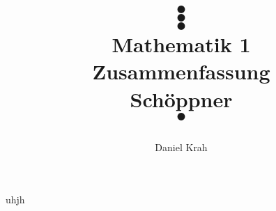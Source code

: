 \documentclass{article}
\title{
\color{white}
 $\bullet$ \\ $\bullet$ \\ $\bullet$ \\
 \color{black}
 \color{black}
 Mathematik 1\\
Zusammenfassung \\
Schöppner \\
\color{white}
$\bullet$ \\
\color{black}
 \begin{center}
\end{center}
}
\author{Daniel Krah}
\begin{document}
\maketitle%



%
% 







% 
\newpage




% 
% 
uhjh


% 
% 
% 
% 

% 




% 
% 
% 
% 
% 
% 


% 






% 
% 
% 
% 
% 
% 
% 




%
\end{document}
